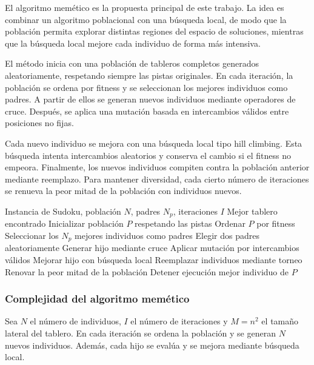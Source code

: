 \documentclass{article}
\begin{document}
El algoritmo memético es la propuesta principal de este trabajo. La idea es combinar un algoritmo poblacional con una búsqueda local, de modo que la población permita explorar distintas regiones del espacio de soluciones, mientras que la búsqueda local mejore cada individuo de forma más intensiva.

El método inicia con una población de tableros completos generados aleatoriamente, respetando siempre las pistas originales. En cada iteración, la población se ordena por fitness y se seleccionan los mejores individuos como padres. A partir de ellos se generan nuevos individuos mediante operadores de cruce. Después, se aplica una mutación basada en intercambios válidos entre posiciones no fijas.

Cada nuevo individuo se mejora con una búsqueda local tipo hill climbing. Esta búsqueda intenta intercambios aleatorios y conserva el cambio si el fitness no empeora. Finalmente, los nuevos individuos compiten contra la población anterior mediante reemplazo. Para mantener diversidad, cada cierto número de iteraciones se renueva la peor mitad de la población con individuos nuevos.

\begin{algorithm}[H]
\caption{Algoritmo memético propuesto}
\begin{algorithmic}[1]
\Require Instancia de Sudoku, población \(N\), padres \(N_p\), iteraciones \(I\)
\Ensure Mejor tablero encontrado
\State Inicializar población \(P\) respetando las pistas
    \State Ordenar \(P\) por fitness
    \State Seleccionar los \(N_p\) mejores individuos como padres
        \State Elegir dos padres aleatoriamente
        \State Generar hijo mediante cruce
        \State Aplicar mutación por intercambios válidos
        \State Mejorar hijo con búsqueda local
    \EndFor
    \State Reemplazar individuos mediante torneo
        \State Renovar la peor mitad de la población
    \EndIf
        \State Detener ejecución
    \EndIf
\EndFor
\State \Return mejor individuo de \(P\)
\end{algorithmic}
\end{algorithm}

\subsubsection{Complejidad del algoritmo memético}

Sea \(N\) el número de individuos, \(I\) el número de iteraciones y \(M=n^2\) el tamaño lateral del tablero. En cada iteración se ordena la población y se generan \(N\) nuevos individuos. Además, cada hijo se evalúa y se mejora mediante búsqueda local.
\end{document}
